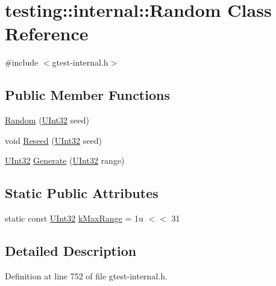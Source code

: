 \hypertarget{classtesting_1_1internal_1_1_random}{}\section{testing\+:\+:internal\+:\+:Random Class Reference}
\label{classtesting_1_1internal_1_1_random}


{\ttfamily \#include $<$gtest-\/internal.\+h$>$}

\subsection*{Public Member Functions}
\begin{DoxyCompactItemize}
\item 
\hyperlink{classtesting_1_1internal_1_1_random_a6e112be5e7cce00551f6383025f69460}{Random} (\hyperlink{namespacetesting_1_1internal_a40d4fffcd2bf56f18b1c380615aa85e3}{U\+Int32} seed)
\item 
void \hyperlink{classtesting_1_1internal_1_1_random_adf2f24199318a46f885c78f50d89a69e}{Reseed} (\hyperlink{namespacetesting_1_1internal_a40d4fffcd2bf56f18b1c380615aa85e3}{U\+Int32} seed)
\item 
\hyperlink{namespacetesting_1_1internal_a40d4fffcd2bf56f18b1c380615aa85e3}{U\+Int32} \hyperlink{classtesting_1_1internal_1_1_random_a9315b7fb621cbcfdf92ed4b5e584c0db}{Generate} (\hyperlink{namespacetesting_1_1internal_a40d4fffcd2bf56f18b1c380615aa85e3}{U\+Int32} range)
\end{DoxyCompactItemize}
\subsection*{Static Public Attributes}
\begin{DoxyCompactItemize}
\item 
static const \hyperlink{namespacetesting_1_1internal_a40d4fffcd2bf56f18b1c380615aa85e3}{U\+Int32} \hyperlink{classtesting_1_1internal_1_1_random_a36d72dd7063d0b5338f229e75382fdd2}{k\+Max\+Range} = 1u $<$$<$ 31
\end{DoxyCompactItemize}


\subsection{Detailed Description}


Definition at line 752 of file gtest-\/internal.\+h.



